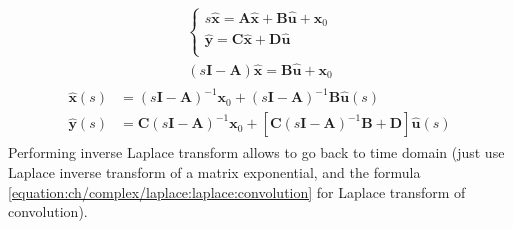 \documentclass[letterpaper,10pt,english]{jupyterBook}
\begin{document}
\begin{equation*}
\begin{split}\begin{cases}
   s \hat{\mathbf{x}} = \mathbf{A} \hat{\mathbf{x}} + \mathbf{B} \hat{\mathbf{u}} + \mathbf{x}_0 \\
     \hat{\mathbf{y}} = \mathbf{C} \hat{\mathbf{x}} + \mathbf{D} \hat{\mathbf{u}} \\
\end{cases}\end{split}
\end{equation*}\begin{equation*}
\begin{split}(s\mathbf{I} - \mathbf{A}) \hat{\mathbf{x}} = \mathbf{B} \hat{\mathbf{u}} + \mathbf{x}_0\end{split}
\end{equation*}\begin{equation*}
\begin{split}\begin{aligned}
  \hat{\mathbf{x}}(s) & = (s\mathbf{I} - \mathbf{A})^{-1} \mathbf{x}_0 + (s\mathbf{I} - \mathbf{A})^{-1} \mathbf{B} \hat{\mathbf{u}}(s) \\
  \hat{\mathbf{y}}(s) & = \mathbf{C} (s\mathbf{I} - \mathbf{A})^{-1}\mathbf{x}_0 + \left[ \mathbf{C} (s\mathbf{I} - \mathbf{A})^{-1} \mathbf{B} + \mathbf{D} \right] \hat{\mathbf{u}}(s)
\end{aligned}\end{split}
\end{equation*}
\sphinxAtStartPar
Performing inverse Laplace transform allows to go back to time domain (just use Laplace inverse transform of a matrix exponential, and the formula \eqref{equation:ch/complex/laplace:laplace:convolution} for Laplace transform of convolution).
\end{document}
